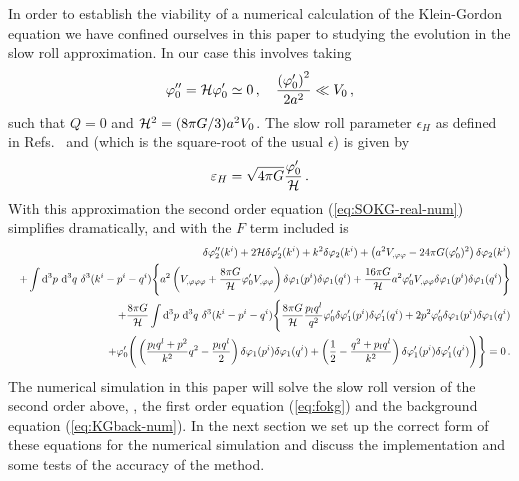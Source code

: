 In order to establish the viability of a numerical calculation of the
Klein-Gordon equation we have confined ourselves in this paper to studying the
evolution in the slow roll approximation. In our case this involves taking
%
\begin{equation}
 \varphi_{0}'' = \mathcal{H} \varphi_{0}' \simeq 0\,,\quad
\frac{\left(\varphi_{0}'\right)^2}{2a^2}\ll V_{0}\,,
\end{equation}
%
such that $Q=0$ and $\mathcal{H}^2 = (8\pi G/3) a^2 V_{0}$. The slow roll parameter
$\epsilon_H$ as defined in Refs.~\cite{Malik:2006ir} and \cite{Seery:2005gb} 
(which is the square-root of the usual $\epsilon$) is given by
%
\begin{equation}
 \varepsilon_H = \sqrt{4\pi G} \frac{\varphi_{0}'}{\mathcal{H}}\,.
\end{equation}
%
With this approximation the second order equation (\ref{eq:SOKG-real-num})
simplifies dramatically, and with the $F$ term included is
%
\begin{eqnarray}
 \label{eq:KG2-fourier-sr-num}
&&\dvp2''(\kvi)+2\H\dvp2'(\kvi)+k^2\dvp2(\kvi)
+\left(a^2
\Upp-{24 \pi G}(\vp_{0}')^2\right)
\dvp2(\kvi) \\
%
&&+\int \d^3p\ \d^3q\ \delta^3(\kvi-\pvi-\qvi) \Bigg\{
a^2\left(\Uppp
+ \frac{8\pi G}{\H}\vp_{0}' \Upp\right)
 \dvp1(\pvi)\dvp1(\qvi)
+\frac{16\pi G}{\H}a^2
\vp_{0}'\Upp\dvp1(\pvi)\dvp1(\qvi)\Bigg\}
\nonumber \\
%
&&+ \frac{8\pi G}{\H}
\int \d^3p\ \d^3q\ \delta^3(\kvi-\pvi-\qvi)  \Bigg\{
%
\frac{8\pi G}{\H}\frac{p_l q^l}{q^2}\vp_{0}'\dvp1'(\pvi)
\dvp1'(\qvi)
+2p^2\vp_{0}' \dvp1(\pvi) \dvp1(\qvi)\nonumber\\
%
&&\qquad\qquad\qquad\qquad
+\vp_{0}'
\Bigg(
\left(\frac{p_lq^l+p^2}{k^2}q^2-\frac{p_lq^l}{2}\right)
\dvp1(\pvi)\dvp1(\qvi)
+\left(\frac{1}{2}-\frac{q^2+p_lq^l}{k^2}\right)
\dvp1'(\pvi)\dvp1'(\qvi)\Bigg)
\Bigg\}=0 \,.\nonumber
\end{eqnarray}
%
The numerical simulation in this paper will solve the slow roll
version of the second order above, , the first
order equation (\ref{eq:fokg}) and the background equation
(\ref{eq:KGback-num}). In the next section we set up the correct form of
these equations for the numerical simulation and discuss the
implementation and some tests of the accuracy of the method.
